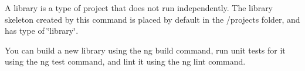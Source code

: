 A library is a type of project that does not run independently. The library skeleton created by this command is placed by default in the {\ttfamily /projects} folder, and has {\ttfamily type} of \char`\"{}library\char`\"{}.

You can build a new library using the {\ttfamily ng build} command, run unit tests for it using the {\ttfamily ng test} command, and lint it using the {\ttfamily ng lint} command. 